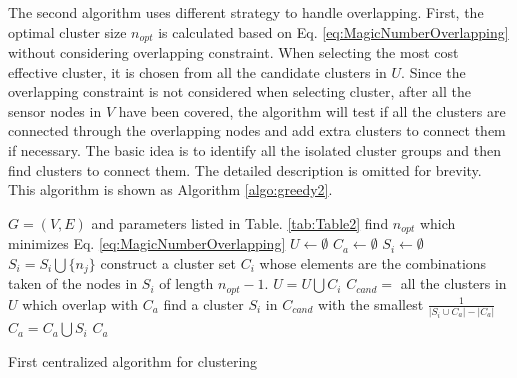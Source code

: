 The second algorithm uses different strategy to handle overlapping.  First, the optimal cluster size \(n_{opt}\) is calculated based on Eq. \ref{eq:MagicNumberOverlapping} without considering overlapping constraint. When selecting the most cost effective cluster, it is chosen from all the candidate clusters in \(U\). Since the overlapping constraint is not considered when selecting cluster, after all the sensor nodes in \(V\) have been covered, the algorithm will test if all the clusters are connected through the overlapping nodes and add extra clusters to connect them if necessary. The basic idea is to identify all the isolated cluster groups and then find clusters to connect them. The detailed description is omitted for brevity. This algorithm is shown as Algorithm \ref{algo:greedy2}. 

\begin{comment}
To achieve this, all the isolated cluster groups (ICGs) from the obtained clusters are identified . Clusters within an ICG are connected through overlapping nodes but do not overlap with other ICGs. Each ICG is then represented as a vertex in a graph \(G_{ICG}\). There is an edge between two vertices in \(G_{ICG}\) if there exist two nodes, each within a ICG corresponding to one of the two vertices, are within the communication range of each other. Then the minimum spanning tree (MST) is found that can connect all the vertices in \(G_{ICG}\). For each edge in the MST, an extra cluster is established in which the two sensor nodes associated with the edge are included. If \(p \geq 2\), then additional nodes should also be added to satisfy the constraint 3 of the optimal clustering problem. This algorithm is shown as Algorithm \ref{algo:greedy2}.
\end{comment}

\begin{algorithm}
\begin{algorithmic}[1]
\REQUIRE \(G=(V, E)\) and parameters listed in Table. \ref{tab:Table2}
\STATE find \(n_{opt}\) which minimizes Eq. \ref{eq:MagicNumberOverlapping}
	\STATE \(U\gets \emptyset\) \(C_a\gets \emptyset\)
		\STATE \(S_i\gets \emptyset\)
			\STATE \(S_i = S_i \bigcup \{n_j\}\)
		\ENDFOR
		\STATE construct a cluster set \(C_i\) whose elements are the combinations taken of the nodes in \(S_i\) of length \(n_{opt} - 1\).
		\STATE \(U=U\bigcup C_i\)
	\ENDFOR
	 	\REPEAT
	 \STATE \(C_{cand} =\) all the clusters in \(U\) which overlap with \(C_a\)
		\STATE find a cluster \(S_i\) in \(C_{cand}\) with the smallest \(\frac{1}{\left|S_i\cup C_a\right| - \left|C_a\right|}\)
		\STATE \(C_a=C_a\bigcup S_i\)	
	\ENSURE \(C_a\)
\end{algorithmic}
\caption{First centralized algorithm for clustering}
\label{algo:greedy1}
\end{algorithm}


